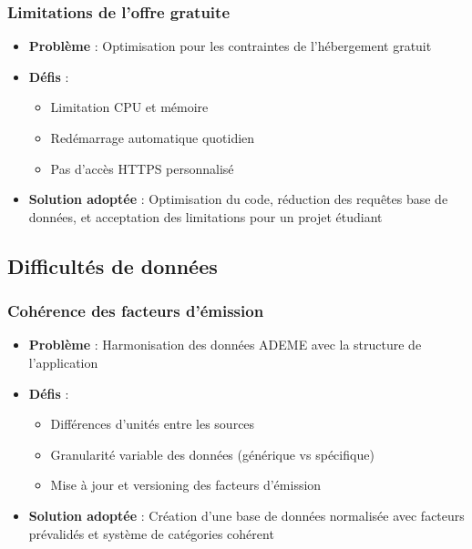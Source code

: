 \documentclass[a4paper,11pt]{article}
\begin{document}
            \subsubsection{Limitations de l'offre gratuite}
                \begin{itemize}
                    \item \textbf{Problème} : Optimisation pour les contraintes de l'hébergement gratuit
                    \item \textbf{Défis} :
                        \begin{itemize}
                            \item Limitation CPU et mémoire
                            \item Redémarrage automatique quotidien
                            \item Pas d'accès HTTPS personnalisé
                        \end{itemize}
                    \item \textbf{Solution adoptée} : Optimisation du code, réduction des requêtes base de données, et acceptation des limitations pour un projet étudiant
                \end{itemize}

        \subsection{Difficultés de données}

            \subsubsection{Cohérence des facteurs d'émission}
                \begin{itemize}
                    \item \textbf{Problème} : Harmonisation des données ADEME avec la structure de l'application
                    \item \textbf{Défis} :
                        \begin{itemize}
                            \item Différences d'unités entre les sources
                            \item Granularité variable des données (générique vs spécifique)
                            \item Mise à jour et versioning des facteurs d'émission
                        \end{itemize}
                    \item \textbf{Solution adoptée} : Création d'une base de données normalisée avec facteurs prévalidés et système de catégories cohérent
                \end{itemize}
\end{document}
